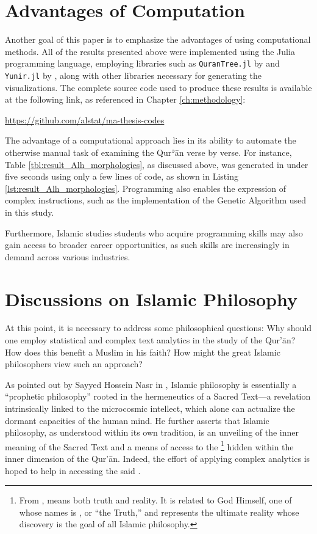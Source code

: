 \section{Advantages of Computation}
Another goal of this paper is to emphasize the advantages of using computational methods. All of the results presented above were implemented using the Julia programming language, employing libraries such as \texttt{QuranTree.jl} by  and \texttt{Yunir.jl} by , along with other libraries necessary for generating the visualizations. The complete source code used to produce these results is available at the following link, as referenced in Chapter \ref{ch:methodology}:
\begin{center}
\url{https://github.com/alstat/ma-thesis-codes}
\end{center}

The advantage of a computational approach lies in its ability to automate the otherwise manual task of examining the Qurʾān verse by verse. For instance, Table \ref{tbl:result_Alh_morphologies}, as discussed above, was generated in under five seconds using only a few lines of code, as shown in Listing \ref{lst:result_Alh_morphologies}. Programming also enables the expression of complex instructions, such as the implementation of the Genetic Algorithm used in this study.

Furthermore, Islamic studies students who acquire programming skills may also gain access to broader career opportunities, as such skills are increasingly in demand across various industries.

\section{Discussions on Islamic Philosophy}\label{sec:result_islamic_philosophy}

At this point, it is necessary to address some philosophical questions: Why should one employ statistical and complex text analytics in the study of the Qur'\=an? How does this benefit a Muslim in his faith? How might the great Islamic philosophers view such an approach?

As pointed out by Sayyed Hossein Nasr in , Islamic philosophy is essentially a ``prophetic philosophy'' rooted in the hermeneutics of a Sacred Text---a revelation intrinsically linked to the microcosmic intellect, which alone can actualize the dormant capacities of the human mind. He further asserts that Islamic philosophy, as understood within its own tradition, is an unveiling of the inner meaning of the Sacred Text and a means of access to the  \footnote{From \cite{nasr2013history},   means both truth and reality. It is related to God Himself, one of whose names is  , or ``the Truth,'' and represents the ultimate reality whose discovery is the goal of all Islamic philosophy.} hidden within the inner dimension of the Qur'\=an. Indeed, the effort of applying complex analytics is hoped to help in accessing the said  .

